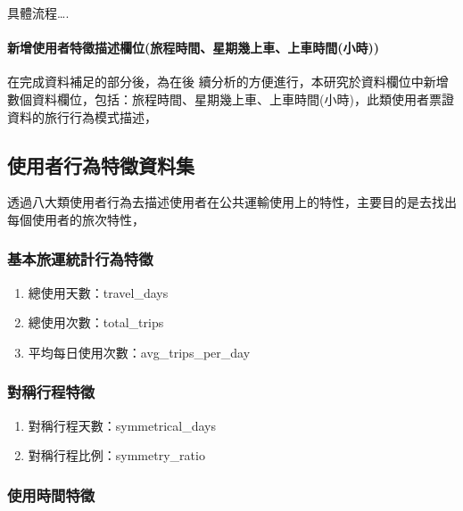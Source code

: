 具體流程\ldots.

\paragraph{新增使用者特徵描述欄位(旅程時間、星期幾上車、上車時間(小時))}\label{ux65b0ux589eux4f7fux7528ux8005ux7279ux5fb5ux63cfux8ff0ux6b04ux4f4dux65c5ux7a0bux6642ux9593ux661fux671fux5e7eux4e0aux8ecaux4e0aux8ecaux6642ux9593ux5c0fux6642}

在完成資料補足的部分後，為在後
續分析的方便進行，本研究於資料欄位中新增數個資料欄位，包括：旅程時間、星期幾上車、上車時間(小時)，此類使用者票證資料的旅行行為模式描述，

\subsection{使用者行為特徵資料集}\label{ux4f7fux7528ux8005ux884cux70baux7279ux5fb5ux8cc7ux6599ux96c6}

透過八大類使用者行為去描述使用者在公共運輸使用上的特性，主要目的是去找出每個使用者的旅次特性，

\subsubsection{基本旅運統計行為特徵}\label{ux57faux672cux65c5ux904bux7d71ux8a08ux884cux70baux7279ux5fb5}

\begin{enumerate}
\def\labelenumi{\arabic{enumi}.}
\tightlist
\item
  總使用天數：travel\_days
\item
  總使用次數：total\_trips
\item
  平均每日使用次數：avg\_trips\_per\_day
\end{enumerate}

\subsubsection{對稱行程特徵}\label{ux5c0dux7a31ux884cux7a0bux7279ux5fb5}

\begin{enumerate}
\def\labelenumi{\arabic{enumi}.}
\tightlist
\item
  對稱行程天數：symmetrical\_days
\item
  對稱行程比例：symmetry\_ratio
\end{enumerate}

\subsubsection{使用時間特徵}\label{ux4f7fux7528ux6642ux9593ux7279ux5fb5}

